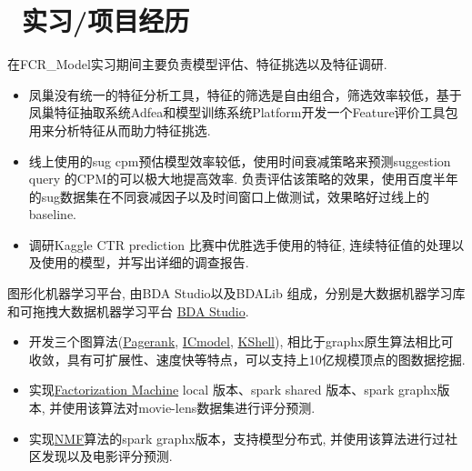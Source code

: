 \documentclass{resume}
\begin{document}
\section{\faUsers\ 实习/项目经历}
\begin{onehalfspacing}
在FCR\_Model实习期间主要负责模型评估、特征挑选以及特征调研.
\begin{itemize}
  \item 凤巢没有统一的特征分析工具，特征的筛选是自由组合，筛选效率较低，基于凤巢特征抽取系统Adfea和模型训练系统Platform开发一个Feature评价工具包用来分析特征从而助力特征挑选.
  \item 线上使用的sug cpm预估模型效率较低，使用时间衰减策略来预测suggestion query 的CPM的可以极大地提高效率. 负责评估该策略的效果，使用百度半年的sug数据集在不同衰减因子以及时间窗口上做测试，效果略好过线上的baseline.
  \item 调研Kaggle CTR prediction 比赛中优胜选手使用的特征, 连续特征值的处理以及使用的模型，并写出详细的调查报告.
\end{itemize}
\end{onehalfspacing}

\begin{onehalfspacing}
图形化机器学习平台, 由BDA Studio以及BDALib 组成，分别是大数据机器学习库和可拖拽大数据机器学习平台 \href{http://bda.space:18080}{BDA Studio}.
\begin{itemize}
  \item 开发三个图算法(\href{http://bda.space:18080/BDAStudioMonitor.html?job=0000001-160229111630187-oozie-oozi-W}{Pagerank}, \href{http://bda.space:18080/BDAStudioMonitor.html?job=0000015-160229111630187-oozie-oozi-W}{ICmodel}, \href{http://bda.space:18080/BDAStudioMonitor.html?job=0000206-151222123224608-oozie-oozi-W}{KShell}), 相比于graphx原生算法相比可收敛，具有可扩展性、速度快等特点，可以支持上10亿规模顶点的图数据挖掘.
  \item 实现\href{http://bda.space:18080/BDAStudioMonitor.html?job=0000009-160229111630187-oozie-oozi-W}{Factorization Machine} local 版本、spark shared 版本、spark graphx版本, 并使用该算法对movie-lens数据集进行评分预测.
  \item 实现\href{http://bda.space:18080/BDAStudioMonitor.html?job=0000021-160229111630187-oozie-oozi-W}{NMF}算法的spark graphx版本，支持模型分布式, 并使用该算法进行过社区发现以及电影评分预测.
\end{itemize}
\end{onehalfspacing}
\end{document}
